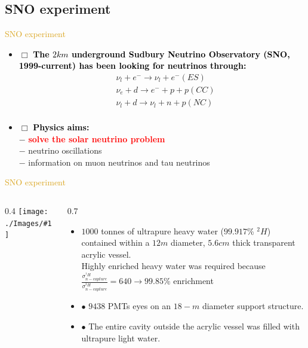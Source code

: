 \documentclass[11pt]{beamer} %
\renewcommand{\(}{\begin{columns}}
\renewcommand{\)}{\end{columns}}
\newcommand{\<}[1]{\begin{column}{#1}}
\renewcommand{\>}{\end{column}}
\newcommand{\itt}{\begin{itemize}}
\newcommand{\tti}{\end{itemize}}
\newcommand{\img}[1]{\texttt{[image: ./Images/\#1]}}
\newcommand{\hlt}[2]{\textcolor{#1}{\textbf{#2}}}
\begin{document}
\subsection{SNO experiment}
\begin{frame}{\textcolor{Goldenrod}{SNO experiment}}
  \begin{overlayarea}{\textwidth}{\textheight}
    \itt[<+->]
  \item[$\Box$] \hlt{Black}{The $2 km $ underground Sudbury Neutrino Observatory (SNO,
      1999-current) has been looking for neutrinos through:}
    \[
      \begin{split}
        &\nu_{l} + e^- \to \nu_l + e^- (ES)\\
        &\nu_e + d \to e^-  + p + p (CC)\\
        & \nu_l + d \to \nu_l + n +p (NC)\\
      \end{split}
      \]
      
    \item[$\Box$] \hlt{black}{Physics aims:}\\
      $-$ \hlt{red}{solve the solar neutrino problem}\\
      $-$ neutrino oscillations\\
      $-$ information on muon neutrinos and tau neutrinos\\
      \tti 
    \end{overlayarea}    
\end{frame}


\begin{frame}{\textcolor{Goldenrod}{SNO experiment}}
  \(
  \<{0.4\textwidth}
  \img{SNO01}
  \>
  \<{0.7\textwidth}
  \itt[<+->]
  \item[\bullet] $1000$ tonnes of ultrapure heavy water
    ($99.917$\% $^2{H}$) contained within a $12 m$ diameter,
    $5.6 cm$ thick transparent acrylic vessel.\\
    \alert{{\small Highly enriched heavy
        water was required because
        $\frac{\sigma^{^1{H}}_{n-capture}} {\sigma^{^2{H}}_{n-capture}} =
        640 \to 99.85$\% enrichment}}
    
  \item[$\bullet$] $9438$ PMTs eyes on an
    $18-m$ diameter support structure. 
  \item[$\bullet$] The entire cavity outside
    the acrylic vessel was filled with ultrapure light water.
    \tti
    \>
    \)
\end{frame}
\end{document}
